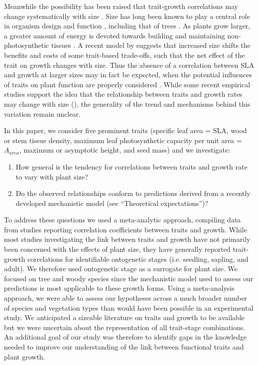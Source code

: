 \documentclass[a4paper,11pt]{article}
\begin{document}
Meanwhile the possibility has been raised that trait-growth correlations may change systematically with size \citep{King-1999, Falster:2011ii, Ruger:2012jv, Iida:2014ep, Iida:2014hq}. Size has long been known to play a central role in organism design and function \citep{Vogel:1988ux, Vogel:2003wb}, including that of trees \citep{Farnsworth:1995im, Givnish:1995ta, King-2011}. As plants grow larger, a greater amount of energy is devoted towards building and maintaining non-photosynthetic tissues \citep{Givnish:1995ta,King-2011}. A recent model by \citet{Falster:2011ii} suggests that increased size shifts the benefits and costs of some trait-based trade-offs, such that the net effect of the trait on growth changes with size. Thus the absence of a correlation between SLA and growth at larger sizes may in fact be expected, when the potential influences of traits on plant function are properly considered \citep{Falster:2011ii}. While some recent empirical studies support the idea that the relationship between traits and growth rates may change with size (\citealt{Iida:2014ep, Iida:2014hq}), the generality of the trend and mechanisms behind this variation remain unclear.

In this paper, we consider five prominent traits (specific leaf area = SLA, wood or stem tissue density, maximum leaf photosynthetic capacity per unit area = $A_{area}$, maximum or asymptotic height, and seed mass) and we investigate:
\begin{enumerate}
  \item How general is the tendency for correlations between traits and growth rate to vary with plant size?
  \item Do the observed relationships conform to predictions derived from a recently developed mechanistic model \citep{Falster:2011ii} (see ``Theoretical expectations'')?
\end{enumerate}
To address these questions we used a meta-analytic approach, compiling data from studies reporting correlation coefficients between traits and growth. While most studies investigating the link between traits and growth have not primarily been concerned with the effects of plant size, they have generally reported trait-growth correlations for identifiable ontogenetic stages (i.e. seedling, sapling, and adult). We therefore used ontogenetic stage as a surrogate for plant size. We focused on tree and woody species since the mechanistic model used to assess our predictions is most applicable to these growth forms.
Using a meta-analysis approach, we were able to assess our hypotheses across a much broader number of species and vegetation types than would have been possible in an experimental study. We anticipated a sizeable literature on traits and growth to be available but we were uncertain about the representation of all trait-stage combinations. An additional goal of our study was therefore to identify gaps in the knowledge needed to improve our understanding of the link between functional traits and plant growth.
\end{document}
